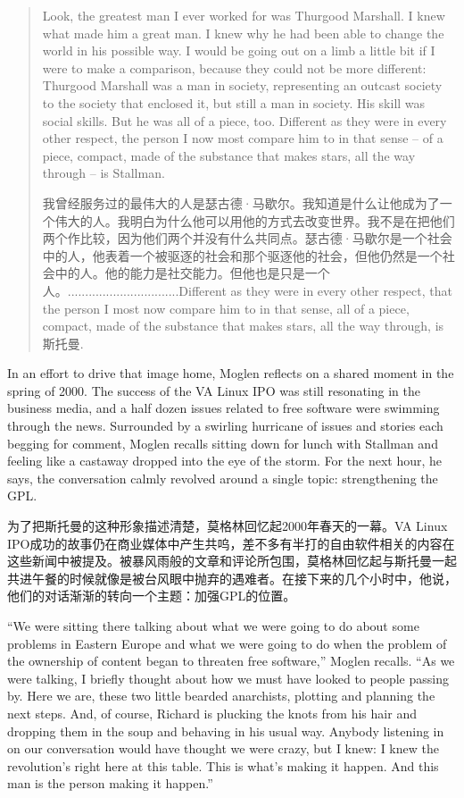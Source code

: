 \begin{quote}
\ifdefined\eng
Look, the greatest man I ever worked for was Thurgood Marshall. I knew what made him a great man. I knew why he had been able to change the world in his possible way. I would be going out on a limb a little bit if I were to make a comparison, because they could not be more different: Thurgood Marshall was a man in society, representing an outcast society to the society that enclosed it, but still a man in society. His skill was social skills. But he was all of a piece, too. Different as they were in every other respect, the person I now most compare him to in that sense -- of a piece, compact, made of the substance that makes stars, all the way through -- is Stallman.
\fi

\ifdefined\chs
我曾经服务过的最伟大的人是瑟古德·马歇尔。我知道是什么让他成为了一个伟大的人。我明白为什么他可以用他的方式去改变世界。我不是在把他们两个作比较，因为他们两个并没有什么共同点。瑟古德·马歇尔是一个社会中的人，他表着一个被驱逐的社会和那个驱逐他的社会，但他仍然是一个社会中的人。他的能力是社交能力。但他也是只是一个人。................................Different as they were in every other respect, that the person I most now compare him to in that sense, all of a piece, compact, made of the substance that makes stars, all the way through, is 斯托曼.
\fi
\end{quote}

\ifdefined\eng
In an effort to drive that image home, Moglen reflects on a shared moment in the spring of 2000. The success of the VA Linux IPO was still resonating in the business media, and a half dozen issues related to free software were swimming through the news. Surrounded by a swirling hurricane of issues and stories each begging for comment, Moglen recalls sitting down for lunch with Stallman and feeling like a castaway dropped into the eye of the storm. For the next hour, he says, the conversation calmly revolved around a single topic: strengthening the GPL.
\fi

\ifdefined\chs
为了把斯托曼的这种形象描述清楚，莫格林回忆起2000年春天的一幕。VA Linux IPO成功的故事仍在商业媒体中产生共呜，差不多有半打的自由软件相关的内容在这些新闻中被提及。被暴风雨般的文章和评论所包围，莫格林回忆起与斯托曼一起共进午餐的时候就像是被台风眼中抛弃的遇难者。在接下来的几个小时中，他说，他们的对话渐渐的转向一个主题：加强GPL的位置。
\fi

\ifdefined\eng
``We were sitting there talking about what we were going to do about some problems in Eastern Europe and what we were going to do when the problem of the ownership of content began to threaten free software,'' Moglen recalls. ``As we were talking, I briefly thought about how we must have looked to people passing by. Here we are, these two little bearded anarchists, plotting and planning the next steps. And, of course, Richard is plucking the knots from his hair and dropping them in the soup and behaving in his usual way. Anybody listening in on our conversation would have thought we were crazy, but I knew: I knew the revolution's right here at this table. This is what's making it happen. And this man is the person making it happen.''
\fi

